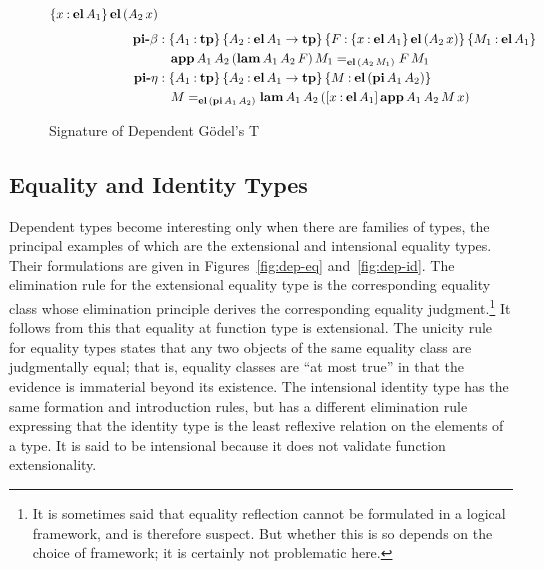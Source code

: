 \documentclass[11pt,twoside]{article}
\newcommand{\braces}[1]{\{#1\}}
\newcommand{\bracks}[1]{[#1]}
\newcommand{\parens}[1]{(#1)}
\newcommand{\eqclass}[3]{{#2}=_{#1}{#3}}
\newcommand{\piclass}[3]{\braces{{#2}\mathbin{:}{#1}}\,{#3}}
\newcommand{\arrclass}[2]{{#1}\to{#2}}
\newcommand{\lamobj}[3]{\bracks{{#2}\mathbin{:}{#1}}\,{#3}}
\newcommand{\appobj}[2]{{#1}\,{#2}}
\begin{document}
\begin{figure}
\begin{align*}
{{{      \piclass{\elof{A_{1}}}{x}{\elofp{\appobj{A_{2}}{x}}}}}} \\[1ex]
%
    \pibeta
    & :
      \piclass{\tpsort}{A_{1}}{
      \piclass{\arrclass{\elof{A_{1}}}{\tpsort}}{A_{2}}{
      \piclass{\piclass{\elof{A_{1}}}{x}{\elofp{\appobj{A_{2}}{x}}}}{F}{
      \piclass{\elof{A_{1}}}{M_{1}}{
      }}}} \\
    & \quad
      \eqclass{\elofp{\appobj{A_{2}}{M_{1}}}}
      {\appof{A_{1}}{A_{2}}{\parens{\lamof{A_{1}}{A_{2}}{F}}}{M_{1}}}
      {\appobj{F}{M_{1}}} \\
    \pieta
    & :
      \piclass{\tpsort}{A_{1}}{
      \piclass{\arrclass{\elof{A_{1}}}{\tpsort}}{A_{2}}{
      \piclass{\elofp{\piof{A_{1}}{A_{2}}}}{M}{
      }}} \\
    & \quad
      \eqclass{\elofp{\piof{A_{1}}{A_{2}}}}
      {M}
      {\lamof{A_{1}}{A_{2}}{\parens{\lamobj{\elof{A_{1}}}{x}{\appof{A_{1}}{A_{2}}{M}{x}}}}}
  \end{align*}

  \caption{Signature of Dependent G\"odel's T}
  \label{fig:t-sig-dep}
\end{figure}

\subsection{Equality and Identity Types}

Dependent types become interesting only when there are families of types, the principal
examples of which are the extensional and intensional equality types.  Their formulations
are given in Figures~\ref{fig:dep-eq} and~\ref{fig:dep-id}.  The elimination rule for the
extensional equality type is the corresponding equality class whose elimination principle
derives the corresponding equality judgment.\footnote{It is sometimes said that equality
  reflection cannot be formulated in a logical framework, and is therefore suspect.  But
  whether this is so depends on the choice of framework; it is certainly not problematic
  here.}  It follows from this that equality at function type is extensional.  The unicity
rule for equality types states that any two objects of the same equality class are
judgmentally equal; that is, equality classes are ``at most true'' in that the evidence is
immaterial beyond its existence.  The intensional identity type has the same formation and
introduction rules, but has a different elimination rule expressing that the identity type
is the least reflexive relation on the elements of a type.  It is said to be intensional
because it does not validate function extensionality.
\end{document}

